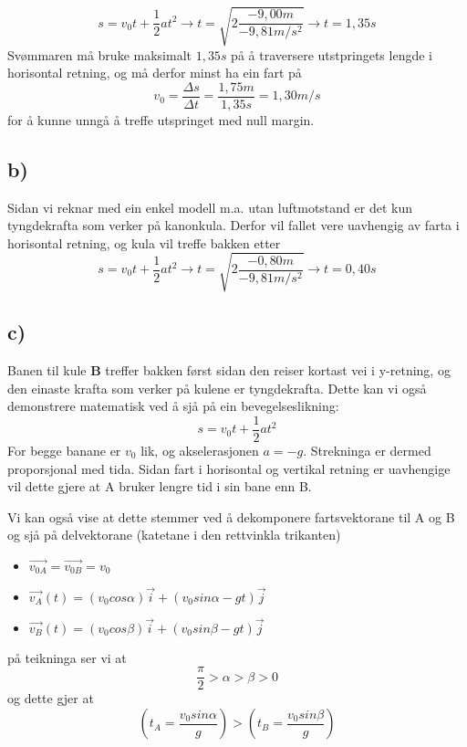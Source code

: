 \documentclass[12pt,a4paper]{article}
\begin{document}
      \begin{equation}
        s = v_0 t + \frac{1}{2} a t^2 \rightarrow t = \sqrt{2\frac{-9,00m}{-9,81m/s^2}}
        \rightarrow t = 1,35s
      \end{equation}
      Svømmaren må bruke maksimalt $1,35s$ på å traversere utstpringets lengde i horisontal
      retning, og må derfor minst ha ein fart på
      \begin{equation}
        v_0 = \frac{\Delta s}{\Delta t} = \frac{1,75 m}{1,35 s} = 1,30 m/s
      \end{equation}
      for å kunne unngå å treffe utspringet med null margin.

    \subsection*{b)}
      Sidan vi reknar med ein enkel modell m.a. utan luftmotstand er det kun tyngdekrafta
      som verker på kanonkula. Derfor vil fallet vere uavhengig av farta i horisontal
      retning, og kula vil treffe bakken etter 
      \begin{equation}
        s = v_0 t + \frac{1}{2} a t^2 \rightarrow t = \sqrt{2\frac{-0,80m}{-9,81m/s^2}}
        \rightarrow t = 0,40s
      \end{equation}

    \subsection*{c)}
      Banen til kule \textbf{B} treffer bakken først sidan den reiser kortast vei i
      y-retning, og den einaste krafta som verker på kulene er tyngdekrafta.
      Dette kan vi også demonstrere matematisk ved å sjå på ein bevegelseslikning:
      \begin{equation}
        s = v_0 t + \frac{1}{2}at^2
      \end{equation}
      For begge banane er $v_0$ lik, og akselerasjonen $a = -g$. Strekninga er dermed
      proporsjonal med tida. Sidan fart i horisontal og vertikal retning er uavhengige vil
      dette gjere at A bruker lengre tid i sin bane enn B.
      \bigskip

      Vi kan også vise at dette stemmer ved å dekomponere fartsvektorane til
      A og B og sjå på delvektorane (katetane i den rettvinkla trikanten)
      \begin{itemize}
        \item $\vec{v_{0A}} = \vec{v_{0B}} = v_0$
        \item $\vec{v_A}(t) = (v_0 cos \alpha)\vec{i} + (v_0 sin \alpha - gt)\vec{j}$
        \item $\vec{v_B}(t) = (v_0 cos \beta)\vec{i} + (v_0 sin \beta - gt)\vec{j}$
      \end{itemize}
      på teikninga ser vi at
      \begin{equation}
        \frac{\pi}{2} > \alpha > \beta > 0
      \end{equation}
      og dette gjer at 
      \begin{equation}
        \left( t_A = \frac{v_0 sin\alpha}{g} \right) >
        \left( t_B = \frac{v_0 sin\beta}{g} \right)
      \end{equation}
\end{document}
